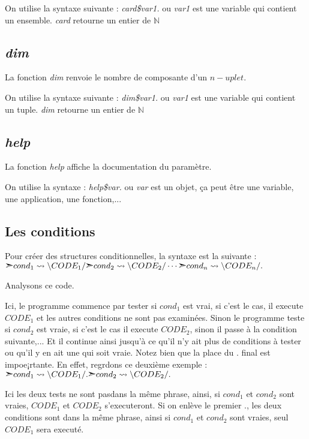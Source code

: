 \documentclass{article}
\begin{document}
On utilise la syntaxe suivante : \textit{card\$var1.} ou \textit{var1} est une variable qui contient un ensemble. \textit{card} retourne un entier de $\mathbb{N}$

\subsection{\textit{dim}}

La fonction \textit{dim} renvoie le nombre de composante d'un $n-uplet$.

On utilise la syntaxe suivante : \textit{dim\$var1.} ou \textit{var1} est une variable qui contient un tuple. \textit{dim} retourne un entier de $\mathbb{N}$

\subsection{\textit{help}}

La fonction \textit{help} affiche la documentation du paramètre.

On utilise la syntaxe : \textit{help\$var.} ou \textit{var} est un objet, ça peut être une variable, une application, une fonction,...

\subsection{Les conditions}

Pour créer des structures conditionnelles, la syntaxe est la suivante : $\text{\ding{227}} cond_1 \leadsto \text{\textbackslash}CODE_1 /\text{\ding{227}} cond_2 \leadsto \text{\textbackslash}CODE_2 / \dotsb \text{\ding{227}} cond_n \leadsto \text{\textbackslash}CODE_n /.$

Analysons ce code.

Ici, le programme commence par tester si $cond_1$ est vrai, si c'est le cas, il execute $CODE_1$ et les autres conditions ne sont pas examinées. Sinon le programme teste si $cond_2$ est vraie, si c'est le cas il execute $CODE_2$, sinon il passe à la condition suivante,... Et il continue ainsi jusqu'à ce qu'il n'y ait plus de conditions à tester ou qu'il y en ait une qui soit vraie. Notez bien que la place du $.$ final est impoe¡rtante. En effet, regrdons ce deuxième exemple : $\text{\ding{227}} cond_1 \leadsto \text{\textbackslash}CODE_1 /.\text{\ding{227}} cond_2 \leadsto \text{\textbackslash}CODE_2 /.$

Ici les deux tests ne sont pasdans la même phrase, ainsi, si $cond_1$ et $cond_2$ sont vraies, $CODE_1$ et $CODE_2$ s'executeront. Si on enlève le premier $.$, les deux conditions sont dans la même phrase, ainsi si $cond_1$ et $cond_2$ sont vraies, seul $CODE_1$ sera executé. 
\end{document}
